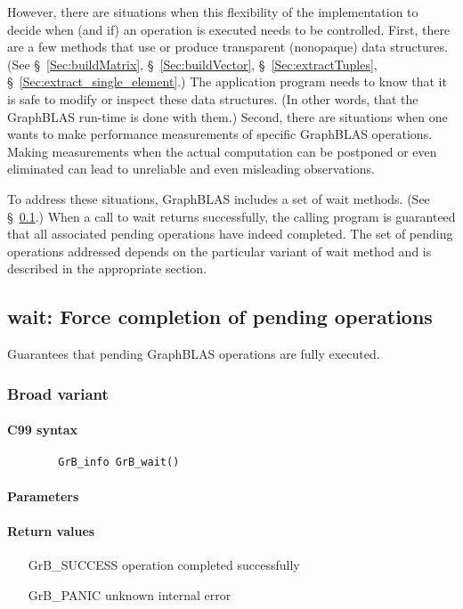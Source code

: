 However, there are situations when this flexibility of the implementation to decide when (and if) an
operation is executed needs to be controlled. First, there are a few methods that use or produce transparent
(nonopaque) data structures. (See \S~\ref{Sec:buildMatrix}, \S~\ref{Sec:buildVector}, \S~\ref{Sec:extractTuples}, \S~\ref{Sec:extract_single_element}.) 
The application program needs to know that it is safe to modify or inspect
these data structures. (In other words, that the GraphBLAS run-time is done with them.)
Second, there are situations when one wants to make performance measurements of specific
GraphBLAS operations. Making measurements when the actual computation can be postponed or even 
eliminated can lead to unreliable and even misleading observations.

To address these situations, GraphBLAS includes a set of {\sf wait} methods. (See \S~\ref{Sec:wait}.)
When a call to {\sf wait} returns successfully, the calling program is guaranteed that all associated
pending operations have indeed completed. The set of pending operations addressed depends on the
particular variant of {\sf wait} method and is described in the appropriate section.

\subsection{{\sf wait}: Force completion of pending operations}
\label{Sec:wait}

Guarantees that pending GraphBLAS operations are fully executed.

\subsubsection{Broad variant}

\paragraph{C99 syntax}

\begin{verbatim}
        GrB_info GrB_wait()
\end{verbatim}

\paragraph{Parameters}

\paragraph{Return values}
\begin{itemize}[leftmargin=2.1in]
\item[{\sf GrB\_SUCCESS}]	operation completed successfully
\item[{\sf GrB\_PANIC}]		unknown internal error
\end{itemize}

